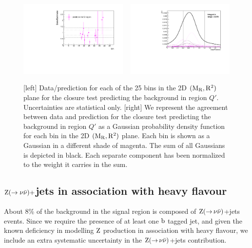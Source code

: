 \begin{figure}[htpb]
\centering
\includegraphics[width=0.48\textwidth]{figures/razor_systematics/closure_summary_0p5_magenta}
~
\includegraphics[width=0.48\textwidth]{figures/razor_systematics/closure_summary_0p5_magenta_gauss2}
\caption{[left] Data/prediction for each of the 25 bins in the 2D $(\mathrm{M_R}, \mathrm{R^2})$ plane for the
closure test predicting the background in region $Q'$. Uncertainties are statistical only.
[right] We represent the agreement between data and prediction for the closure test predicting the
background in region $Q'$ as a Gaussian probability density function for each bin in the 2D
$(\mathrm{M_R},\mathrm{R^2})$ plane. Each bin is shown as a Gaussian in a different shade of magenta. The sum of all
Gaussians is depicted in black. Each separate component has been normalized to the weight it
carries in the sum. 
\label{fig:boost_systematics_closure_QCD}}
\end{figure}

\subsection{\texorpdfstring{$\mathrm{Z} (\rightarrow \nu \bar{\nu})+$jets}{Z(nunu)+jets} in
association with heavy flavour} 

About 8\% of the background in the signal region is composed of
$\mathrm{Z}({\rightarrow}\,\nu\bar{\nu})$+jets
events. Since we require the presence of at least one $\mathrm{b}$ tagged jet, and given the known
deficiency in modelling $\mathrm{Z}$ production in association with heavy flavour, we include an extra
systematic uncertainty in the $\mathrm{Z}({\rightarrow}\,\nu\bar{\nu})$+jets contribution.  

